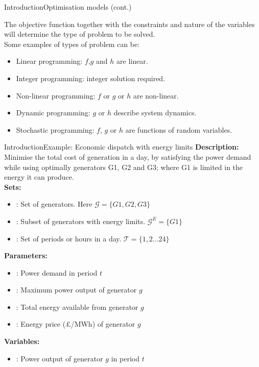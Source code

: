 \documentclass[handout]{beamer}
\newcommand{\overbar}[1]{\mkern 1.5mu\overline{\mkern-1.5mu#1\mkern-1.5mu}\mkern 1.5mu}
\newcommand\Fontvi{\fontsize{9.5}{10.7}\selectfont}
\begin{document}
\begin{frame}[t]{Introduction}{Optimisation models (cont.)}

The objective function together with the constraints and nature of the variables will determine the type of problem to be solved.\\[12pt]

Some examples of types of problem can be:\\[12pt]
\begin{itemize}
\item Linear programming: $f$,$g$ and $h$ are linear.
\item Integer programming: integer solution required.
\item Non-linear programming: $f$ or $g$ or $h$ are non-linear.
\item Dynamic programming: $g$ or $h$ describe system dynamics.
\item Stochastic programming: $f$, $g$ or $h$ are functions of random variables.
\end{itemize}

\end{frame}


\begin{frame}[t]{Introduction}{Example: Economic dispatch with energy limits}
\Fontvi
\textbf{Description:}\\
Minimise the total cost of generation in a day, by satisfying the power demand while using optimally generators G1, G2 and G3; where G1 is limited in the energy it can produce.\\[6pt]

\textbf{Sets:}
\begin{itemize}
    \item {: Set of generators. Here $\mathcal{G} = \{G1,G2,G3\}$}
    \item {: Subset of generators with energy limits. $\mathcal{G}^E = \{G1\}$}
    \item {: Set of periods or hours in a day. $\mathcal{T} = \{1,2...24\}$}
\end{itemize}

\textbf{Parameters:}
\begin{itemize}
    \item {: Power demand in period $t$}
    \item {\makebox[0.75cm]{$\overbar{P}_g$\hfill}: Maximum power output of generator $g$}
    \item {: Total energy available from generator $g$}
    \item {: Energy price (£/MWh) of generator $g$}
\end{itemize}

\textbf{Variables:}
\begin{itemize}
    \item {: Power output of generator $g$ in period $t$}
\end{itemize}
\end{frame}
\end{document}
